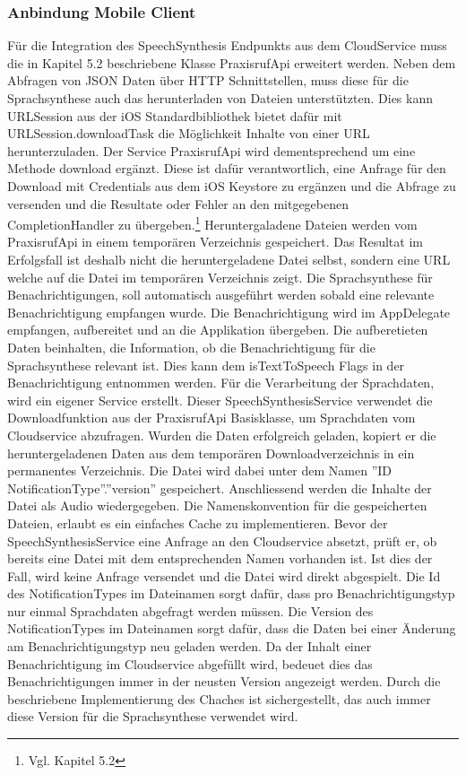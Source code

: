 \clearpage
\subsubsection{Anbindung Mobile Client}

Für die Integration des SpeechSynthesis Endpunkts aus dem CloudService muss die in Kapitel 5.2 beschriebene Klasse PraxisrufApi erweitert werden.
Neben dem Abfragen von JSON Daten über HTTP Schnittstellen, muss diese für die Sprachsynthese auch das herunterladen von Dateien unterstützten.
Dies kann URLSession aus der iOS Standardbibliothek bietet dafür mit URLSession.downloadTask die Möglichkeit Inhalte von einer URL herunterzuladen.\cite{ios_downloadtask}
Der Service PraxisrufApi wird dementsprechend um eine Methode download ergänzt.
Diese ist dafür verantwortlich, eine Anfrage für den Download mit Credentials aus dem iOS Keystore zu ergänzen und die Abfrage zu versenden
und die Resultate oder Fehler an den mitgegebenen CompletionHandler zu übergeben.\footnote{Vgl. Kapitel 5.2}
Heruntergaladene Dateien werden vom PraxisrufApi in einem temporären Verzeichnis gespeichert.
Das Resultat im Erfolgsfall ist deshalb nicht die heruntergeladene Datei selbst, sondern eine URL welche auf die Datei im temporären Verzeichnis zeigt.
Die Sprachsynthese für Benachrichtigungen, soll automatisch ausgeführt werden sobald eine relevante Benachrichtigung empfangen wurde.
Die Benachrichtigung wird im AppDelegate empfangen, aufbereitet und an die Applikation übergeben.
Die aufberetieten Daten beinhalten, die Information, ob die Benachrichtigung für die Sprachsynthese relevant ist.
Dies kann dem isTextToSpeech Flags in der Benachrichtigung entnommen werden.
Für die Verarbeitung der Sprachdaten, wird ein eigener Service erstellt.
Dieser SpeechSynthesisService verwendet die Downloadfunktion aus der PraxisrufApi Basisklasse, um Sprachdaten vom Cloudservice abzufragen.
Wurden die Daten erfolgreich geladen, kopiert er die heruntergeladenen Daten aus dem temporären Downloadverzeichnis in ein permanentes Verzeichnis.
Die Datei wird dabei unter dem Namen ''ID NotificationType''.''version'' gespeichert.
Anschliessend werden die Inhalte der Datei als Audio wiedergegeben.
Die Namenskonvention für die gespeicherten Dateien, erlaubt es ein einfaches Cache zu implementieren.
Bevor der SpeechSynthesisService eine Anfrage an den Cloudservice absetzt, prüft er, ob bereits eine Datei mit dem entsprechenden Namen vorhanden ist.
Ist dies der Fall, wird keine Anfrage versendet und die Datei wird direkt abgespielt.
Die Id des NotificationTypes im Dateinamen sorgt dafür, dass pro Benachrichtigungstyp nur einmal Sprachdaten abgefragt werden müssen.
Die Version des NotificationTypes im Dateinamen sorgt dafür, dass die Daten bei einer Änderung am Benachrichtigungstyp neu geladen werden.
Da der Inhalt einer Benachrichtigung im Cloudservice abgefüllt wird, bedeuet dies das Benachrichtigungen immer in der neusten Version angezeigt werden.
Durch die beschriebene Implementierung des Chaches ist sichergestellt, das auch immer diese Version für die Sprachsynthese verwendet wird.

